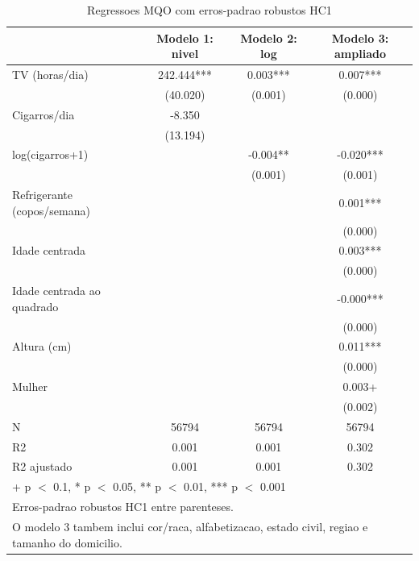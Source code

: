 \begin{table}
\centering
\caption{Regressoes MQO com erros-padrao robustos HC1}
\centering
\begin{tabular}[t]{lccc}
\toprule
  & Modelo 1: nivel & Modelo 2: log & Modelo 3: ampliado\\
\midrule
TV (horas/dia) & 242.444*** & 0.003*** & 0.007***\\
 & (40.020) & (0.001) & (0.000)\\
Cigarros/dia & -8.350 &  & \\
 & (13.194) &  & \\
log(cigarros+1) &  & -0.004** & -0.020***\\
 &  & (0.001) & (0.001)\\
Refrigerante (copos/semana) &  &  & 0.001***\\
 &  &  & \vphantom{3} (0.000)\\
Idade centrada &  &  & 0.003***\\
 &  &  & \vphantom{2} (0.000)\\
Idade centrada ao quadrado &  &  & -0.000***\\
 &  &  & \vphantom{1} (0.000)\\
Altura (cm) &  &  & 0.011***\\
 &  &  & (0.000)\\
Mulher &  &  & 0.003+\\
 &  &  & (0.002)\\
\midrule
N & 56794 & 56794 & 56794\\
R2 & 0.001 & 0.001 & 0.302\\
R2 ajustado & 0.001 & 0.001 & 0.302\\
\bottomrule
\multicolumn{4}{l}{\rule{0pt}{1em}+ p $<$ 0.1, * p $<$ 0.05, ** p $<$ 0.01, *** p $<$ 0.001}\\
\multicolumn{4}{l}{\rule{0pt}{1em}Erros-padrao robustos HC1 entre parenteses.}\\
\multicolumn{4}{l}{\rule{0pt}{1em}O modelo 3 tambem inclui cor/raca, alfabetizacao, estado civil, regiao e tamanho do domicilio.}\\
\end{tabular}
\end{table}
